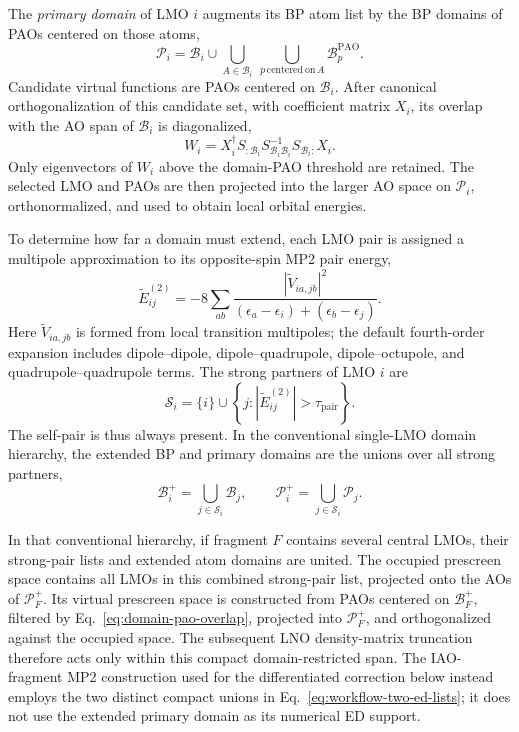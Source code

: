 \documentclass[11pt]{article}
\newcommand{\Bdom}{\mathcal{B}}
\newcommand{\Pdom}{\mathcal{P}}
\newcommand{\Sset}{\mathcal{S}}
\begin{document}
The \emph{primary domain} of LMO $i$ augments its BP atom list by the BP domains
of PAOs centered on those atoms,
\begin{equation}
  \Pdom_i = \Bdom_i \cup
  \bigcup_{A\in\Bdom_i}
  \ \bigcup_{p\,\mathrm{centered\ on}\,A}
  \Bdom_p^{\mathrm{PAO}} .
  \label{eq:primary-domain}
\end{equation}
Candidate virtual functions are PAOs centered on $\Bdom_i$.  After canonical
orthogonalization of this candidate set, with coefficient matrix $X_i$, its
overlap with the AO span of $\Bdom_i$ is diagonalized,
\begin{equation}
  W_i = X_i^\dagger S_{:\Bdom_i}S_{\Bdom_i\Bdom_i}^{-1}
        S_{\Bdom_i:}X_i .
  \label{eq:domain-pao-overlap}
\end{equation}
Only eigenvectors of $W_i$ above the domain-PAO threshold are retained.  The
selected LMO and PAOs are then projected into the larger AO space on
$\Pdom_i$, orthonormalized, and used to obtain local orbital energies.

To determine how far a domain must extend, each LMO pair is assigned a
multipole approximation to its opposite-spin MP2 pair energy,
\begin{equation}
  \widetilde E_{ij}^{(2)} = -8\sum_{ab}
  \frac{|\widetilde V_{ia,jb}|^2}
  {(\epsilon_a-\epsilon_i)+(\epsilon_b-\epsilon_j)} .
  \label{eq:multipole-pair-energy}
\end{equation}
Here $\widetilde V_{ia,jb}$ is formed from local transition multipoles; the
default fourth-order expansion includes dipole--dipole, dipole--quadrupole,
dipole--octupole, and quadrupole--quadrupole terms.  The strong partners of LMO
$i$ are
\begin{equation}
  \Sset_i = \{i\}\cup
  \left\{j:\left|\widetilde E_{ij}^{(2)}\right|>\tau_{\mathrm{pair}}\right\}.
  \label{eq:strong-pairs}
\end{equation}
The self-pair is thus always present.  In the conventional single-LMO domain
hierarchy, the extended BP and primary domains are the unions over all strong
partners,
\begin{equation}
  \Bdom_i^+ = \bigcup_{j\in\Sset_i}\Bdom_j,
  \qquad
  \Pdom_i^+ = \bigcup_{j\in\Sset_i}\Pdom_j .
  \label{eq:extended-domains}
\end{equation}

In that conventional hierarchy, if fragment $F$ contains several central LMOs, their strong-pair
lists and extended atom domains are united.  The occupied prescreen space
contains all LMOs in this combined strong-pair list, projected onto the AOs of
$\Pdom_F^+$.  Its virtual prescreen space is constructed from PAOs centered on
$\Bdom_F^+$, filtered by Eq.~\eqref{eq:domain-pao-overlap}, projected into
$\Pdom_F^+$, and orthogonalized against the occupied space.  The subsequent
LNO density-matrix truncation therefore acts only within this compact
domain-restricted span.
The IAO-fragment MP2 construction used for the differentiated correction
below instead employs the two distinct compact unions in
Eq.~\eqref{eq:workflow-two-ed-lists}; it does not use the extended primary
domain as its numerical ED support.
\end{document}
